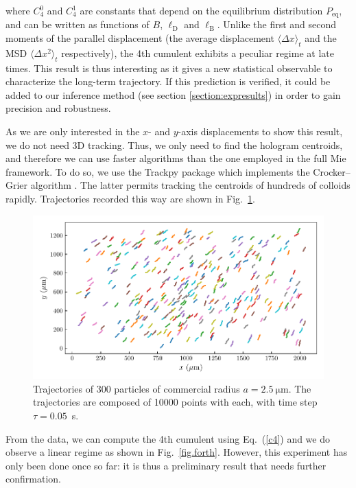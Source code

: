 where $ C_4 ^0$ and $ C_4 ^1$ are constants that depend on the equilibrium distribution $P_\mathrm{eq}$, and can be written as functions of $B$, $\ell _ \mathrm{D}$ and $\ell _\mathrm{B}$. Unlike the first and second moments of the parallel displacement (the average displacement $\langle \Delta x \rangle_t$ and the \gls{MSD} $\langle \Delta x ^2 \rangle_t $ respectively), the 4th cumulent exhibits a peculiar regime at late times. This result is thus interesting as it gives a new statistical observable to characterize the long-term trajectory. If this prediction is verified, it could be added to our inference method (see section \ref{section:expresults}) in order to gain precision and robustness.

As we are only interested in the $x$- and $y$-axis displacements to show this result, we do not need 3D tracking. Thus, we only need to find the hologram centroids, and therefore we can use faster algorithms than the one employed in the full Mie framework. To do so, we use the Trackpy package \href{https://github.com/soft-matter/trackpy}{\faGithub} \cite{allan_soft-mattertrackpy_2021} which implements the Crocker–Grier algorithm \cite{crocker_methods_1996}. The latter permits tracking the centroids of hundreds of colloids rapidly. Trajectories recorded this way are shown in Fig.~\ref{fig.trajtrackpy}.
\begin{figure}[H]
	\centering
	\includegraphics{02_body/chapter4/images/4th_cumulent/trajectories.pdf}
	\caption{Trajectories of 300 particles of commercial radius $a=2.5 ~ \mathrm{\mu m}$. The trajectories are composed of 10000 points with each, with time step $\tau = 0.05$~s. }
	\label{fig.trajtrackpy}
\end{figure}
From the data, we can compute the 4th cumulent using Eq.~(\ref{c4}) and we do observe a linear regime as shown in Fig.~\ref{fig.forth}. However, this experiment has only been done once so far: it is thus a preliminary result that needs further confirmation.
